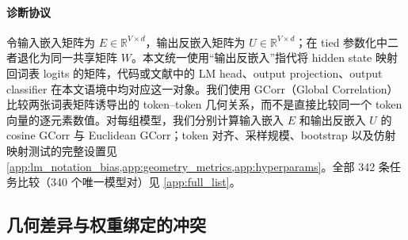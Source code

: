 \documentclass{article}
\theoremstyle{plain}
\theoremstyle{definition}
\theoremstyle{remark}
\begin{document}
\begin{table}[h]
\centering
\caption{实证分析中使用的模型。我们将最新 embedding 分析划分为四个任务：Base vs.\ Instruct 对齐、系列内部缩放规律、跨规模/跨系列比较，以及 MoE 跨家族比较。表中数量为四个任务中参与 342 条任务比较（340 个唯一模型对）的唯一模型数。}
\label{tab:model_zoo}
\begin{small}
\begin{sc}
\end{sc}
\end{small}
\vskip -0.1in
\end{table}

\paragraph{诊断协议}
令输入嵌入矩阵为 $E\in\mathbb{R}^{V\times d}$，输出反嵌入矩阵为 $U\in\mathbb{R}^{V\times d}$；在 tied 参数化中二者退化为同一共享矩阵 $W$。本文统一使用“输出反嵌入”指代将 hidden state 映射回词表 logits 的矩阵，代码或文献中的 LM head、output projection、output classifier 在本文语境中均对应这一对象。我们使用 GCorr（Global Correlation）比较两张词表矩阵诱导出的 token--token 几何关系，而不是直接比较同一个 token 向量的逐元素数值。对每组模型，我们分别计算输入嵌入 $E$ 和输出反嵌入 $U$ 的 cosine GCorr 与 Euclidean GCorr；token 对齐、采样规模、bootstrap 以及仿射映射测试的完整设置见 \cref{app:lm_notation_bias,app:geometry_metrics,app:hyperparams}。全部 342 条任务比较（340 个唯一模型对）见 \cref{app:full_list}。

\subsection{几何差异与权重绑定的冲突}
\label{sec:results_analysis}
\end{document}
